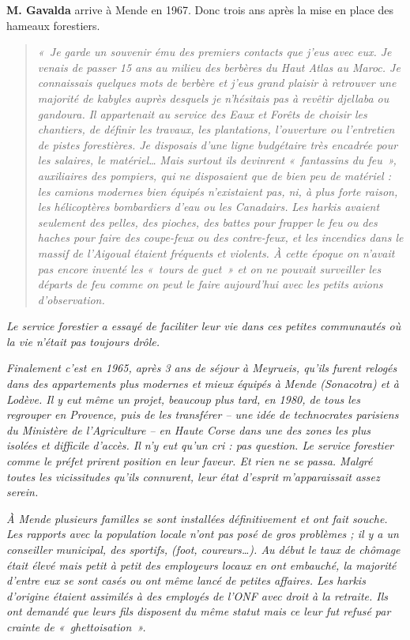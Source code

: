 \textbf{M. Gavalda} arrive à Mende en 1967. Donc trois ans après la mise en place des
hameaux forestiers.

\begin{quote}
\textit{«~Je garde un souvenir ému des premiers contacts que j’eus avec eux. Je venais de
passer 15 ans au milieu des berbères du Haut Atlas au Maroc. Je connaissais
quelques mots de berbère et j’eus grand plaisir à retrouver une majorité de kabyles
auprès desquels je n’hésitais pas à revêtir djellaba ou gandoura.}
\textit{Il appartenait au service des Eaux et Forêts de choisir les chantiers, de définir les
travaux, les plantations, l’ouverture ou l’entretien de pistes forestières. Je disposais
d’une ligne budgétaire très encadrée pour les salaires, le matériel…}
\textit{Mais surtout ils devinrent «~fantassins du feu~», auxiliaires des pompiers, qui ne
disposaient que de bien peu de matériel : les camions modernes bien équipés
n’existaient pas, ni, à plus forte raison, les hélicoptères bombardiers d’eau ou les
Canadairs.}
\textit{Les harkis avaient seulement des pelles, des pioches, des battes pour frapper le feu
ou des haches pour faire des coupe-feux ou des contre-feux, et les incendies dans le
massif de l’Aigoual étaient fréquents et violents. À cette époque on n’avait pas
encore inventé les «~tours de guet~» et on ne pouvait surveiller les départs de feu
comme on peut le faire aujourd’hui avec les petits avions d’observation.}
\end{quote}

\textit{Le service forestier a essayé de faciliter leur vie dans ces petites communautés où la
vie n’était pas toujours drôle.}

\textit{Finalement c’est en 1965, après 3 ans de séjour à Meyrueis, qu’ils furent relogés
dans des appartements plus modernes et mieux équipés à Mende (Sonacotra) et à
Lodève.
Il y eut même un projet, beaucoup plus tard, en 1980, de tous les regrouper en
Provence, puis de les transférer -- une idée de technocrates parisiens du Ministère
de l’Agriculture -- en Haute Corse dans une des zones les plus isolées et difficile
d’accès. Il n’y eut qu’un cri : pas question. Le service forestier comme le préfet
prirent position en leur faveur. Et rien ne se passa. Malgré toutes les vicissitudes
qu’ils connurent, leur état d’esprit m’apparaissait assez serein.}


\textit{À Mende plusieurs familles se sont installées définitivement et ont fait souche. Les
rapports avec la population locale n’ont pas posé de gros problèmes ; il y a un
conseiller municipal, des sportifs, (foot, coureurs…). Au début le taux de chômage
était élevé mais petit à petit des employeurs locaux en ont embauché, la majorité
d’entre eux se sont casés ou ont même lancé de petites affaires.
Les harkis d’origine étaient assimilés à des employés de l’ONF avec droit à la
retraite. Ils ont demandé que leurs fils disposent du même statut mais ce leur fut
refusé par crainte de «~ghettoisation~».}

